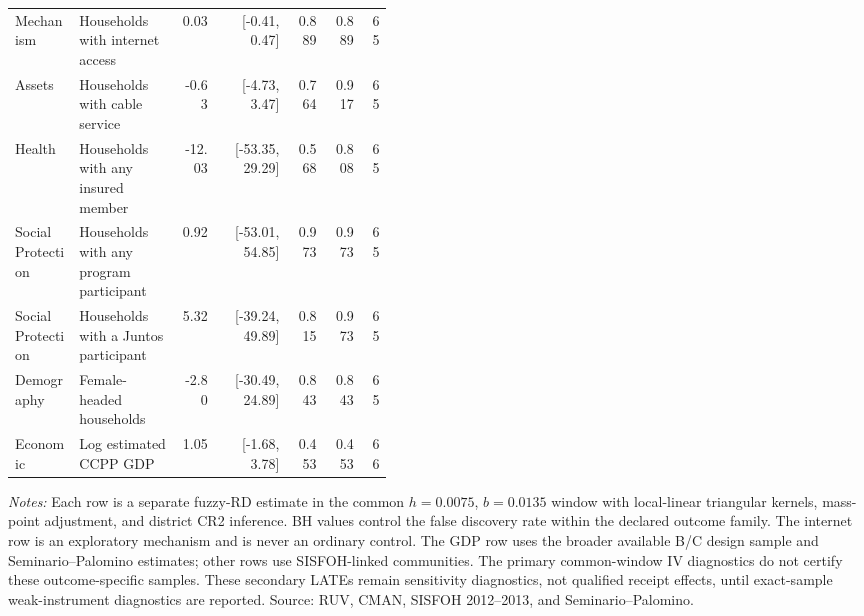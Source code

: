 \begin{longtable}{p{0.17\linewidth}p{0.27\linewidth}rrrrr}
Mechanism & Households with internet access & 0.03 & [-0.41, 0.47] & 0.889 & 0.889 & 65 \\
Assets & Households with cable service & -0.63 & [-4.73, 3.47] & 0.764 & 0.917 & 65 \\
Health & Households with any insured member & -12.03 & [-53.35, 29.29] & 0.568 & 0.808 & 65 \\
Social Protection & Households with any program participant & 0.92 & [-53.01, 54.85] & 0.973 & 0.973 & 65 \\
Social Protection & Households with a Juntos participant & 5.32 & [-39.24, 49.89] & 0.815 & 0.973 & 65 \\
Demography & Female-headed households & -2.80 & [-30.49, 24.89] & 0.843 & 0.843 & 65 \\
Economic & Log estimated CCPP GDP & 1.05 & [-1.68, 3.78] & 0.453 & 0.453 & 66 \\
\bottomrule
\end{longtable}
\begin{minipage}{0.98\linewidth}\footnotesize\textit{Notes:} Each row is a separate fuzzy-RD estimate in the common \(h=0.0075\), \(b=0.0135\) window with local-linear triangular kernels, mass-point adjustment, and district CR2 inference. BH values control the false discovery rate within the declared outcome family. The internet row is an exploratory mechanism and is never an ordinary control. The GDP row uses the broader available B/C design sample and Seminario--Palomino estimates; other rows use SISFOH-linked communities. The primary common-window IV diagnostics do not certify these outcome-specific samples. These secondary LATEs remain sensitivity diagnostics, not qualified receipt effects, until exact-sample weak-instrument diagnostics are reported. Source: RUV, CMAN, SISFOH 2012--2013, and Seminario--Palomino.\end{minipage}
